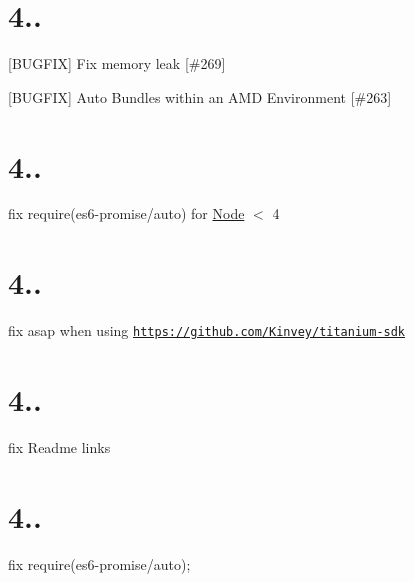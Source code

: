\section*{4..}


\begin{DoxyItemize}
\item \mbox{[}B\+U\+G\+F\+IX\mbox{]} Fix memory leak \mbox{[}\#269\mbox{]}
\item \mbox{[}B\+U\+G\+F\+IX\mbox{]} Auto Bundles within an A\+MD Environment \mbox{[}\#263\mbox{]}
\end{DoxyItemize}

\section*{4..}


\begin{DoxyItemize}
\item fix require(\textquotesingle{}es6-\/promise/auto\textquotesingle{}) for \mbox{\hyperlink{classNode}{Node}} $<$ 4
\end{DoxyItemize}

\section*{4..}


\begin{DoxyItemize}
\item fix asap when using \href{https://github.com/Kinvey/titanium-sdk}{\tt https\+://github.\+com/\+Kinvey/titanium-\/sdk}
\end{DoxyItemize}

\section*{4..}


\begin{DoxyItemize}
\item fix Readme links
\end{DoxyItemize}

\section*{4..}


\begin{DoxyItemize}
\item fix require(\textquotesingle{}es6-\/promise/auto\textquotesingle{});
\end{DoxyItemize}

